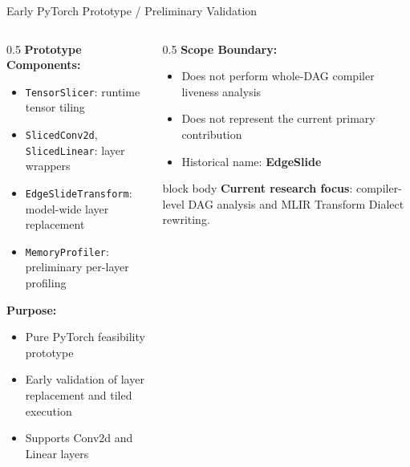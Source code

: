 \documentclass[10pt,aspectratio=169]{beamer}
\begin{document}
\begin{frame}{Early PyTorch Prototype / Preliminary Validation}
\begin{columns}
\begin{column}{0.5\textwidth}
\textbf{Prototype Components:}
\begin{itemize}
\small
\item \texttt{TensorSlicer}: runtime tensor tiling
\item \texttt{SlicedConv2d}, \texttt{SlicedLinear}: layer wrappers
\item \texttt{EdgeSlideTransform}: model-wide layer replacement
\item \texttt{MemoryProfiler}: preliminary per-layer profiling
\end{itemize}

\vspace{0.25cm}
\textbf{Purpose:}
\begin{itemize}
\small
\item Pure PyTorch feasibility prototype
\item Early validation of layer replacement and tiled execution
\item Supports Conv2d and Linear layers
\end{itemize}
\end{column}

\begin{column}{0.5\textwidth}
\textbf{Scope Boundary:}
\begin{itemize}
\small
\item Does not perform whole-DAG compiler liveness analysis
\item Does not represent the current primary contribution
\item Historical name: \textbf{EdgeSlide}
\end{itemize}

\vspace{0.4cm}
\begin{beamercolorbox}[sep=0.4em,center,rounded=true,shadow=true]{block body}
\small
\textbf{Current research focus}: compiler-level DAG analysis and MLIR Transform Dialect rewriting.
\end{beamercolorbox}
\end{column}
\end{columns}
\end{frame}
\end{document}
